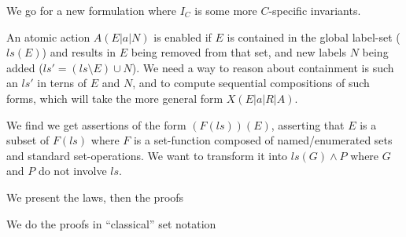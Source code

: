\label{ha:mViews}


We go for a new formulation
where $I_C$ is some more $C$-specific invariants.


An atomic action $A(E|a|N)$ is enabled if $E$ is contained
in the global label-set ($ls(E)$)
and results in $E$ being removed from that set, and new labels
$N$ being added ($ls'=(ls\setminus E)\cup N$).
We need a way to reason about containment is such an $ls'$
in terns of $E$ and $N$, and to compute sequential compositions
of such forms, which will take the more general form $X(E|a|R|A)$.

We find we get assertions of the form $(F(ls))(E)$,
asserting that $E$ is a subset of $F(ls)$ where $F$ is a set-function
composed of named/enumerated sets and standard set-operations.
We want to transform it into $ls(G) \land P$ where $G$ and $P$
do not involve $ls$.

We present the laws,
then the proofs

We do the proofs in ``classical'' set notation

